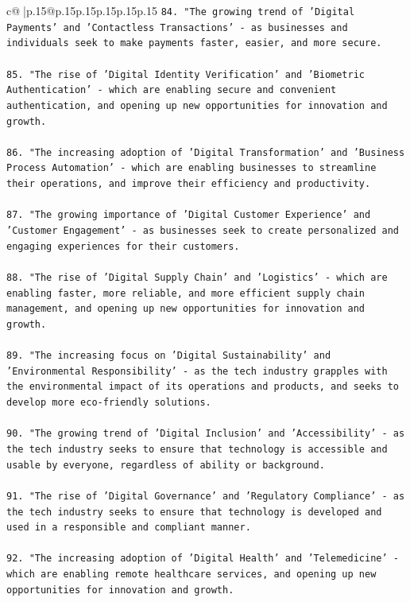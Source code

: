 \documentclass{article}
\begin{document}
{\begin{supertabular}{c@{$\;$}|p{.15\linewidth}@{}p{.15\linewidth}p{.15\linewidth}p{.15\linewidth}p{.15\linewidth}p{.15\linewidth}}
{{{\texttt{84. "The growing trend of 'Digital Payments' and 'Contactless Transactions' {-} as businesses and individuals seek to make payments faster, easier, and more secure.} \\
\\ 
\texttt{85. "The rise of 'Digital Identity Verification' and 'Biometric Authentication' {-} which are enabling secure and convenient authentication, and opening up new opportunities for innovation and growth.} \\
\\ 
\texttt{86. "The increasing adoption of 'Digital Transformation' and 'Business Process Automation' {-} which are enabling businesses to streamline their operations, and improve their efficiency and productivity.} \\
\\ 
\texttt{87. "The growing importance of 'Digital Customer Experience' and 'Customer Engagement' {-} as businesses seek to create personalized and engaging experiences for their customers.} \\
\\ 
\texttt{88. "The rise of 'Digital Supply Chain' and 'Logistics' {-} which are enabling faster, more reliable, and more efficient supply chain management, and opening up new opportunities for innovation and growth.} \\
\\ 
\texttt{89. "The increasing focus on 'Digital Sustainability' and 'Environmental Responsibility' {-} as the tech industry grapples with the environmental impact of its operations and products, and seeks to develop more eco{-}friendly solutions.} \\
\\ 
\texttt{90. "The growing trend of 'Digital Inclusion' and 'Accessibility' {-} as the tech industry seeks to ensure that technology is accessible and usable by everyone, regardless of ability or background.} \\
\\ 
\texttt{91. "The rise of 'Digital Governance' and 'Regulatory Compliance' {-} as the tech industry seeks to ensure that technology is developed and used in a responsible and compliant manner.} \\
\\ 
\texttt{92. "The increasing adoption of 'Digital Health' and 'Telemedicine' {-} which are enabling remote healthcare services, and opening up new opportunities for innovation and growth.} \\
\\ 
}}}
\end{supertabular}}
\end{document}
